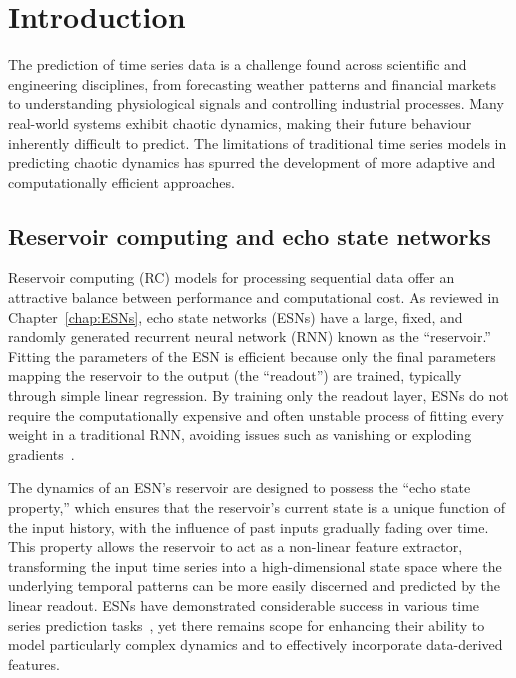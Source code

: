 
\renewcommand{\chapterlabel}{Chapter}
\chapter{Introduction}
\label{chap:introduction}

The prediction of time series data is a challenge found across scientific and engineering disciplines, from forecasting weather patterns and financial markets to understanding physiological signals and controlling industrial processes. Many real-world systems exhibit chaotic dynamics, making their future behaviour inherently difficult to predict. The limitations of traditional time series models in predicting chaotic dynamics has spurred the development of more adaptive and computationally efficient approaches.

\section{Reservoir computing and echo state networks}
\label{sec:rc_and_esn}

Reservoir computing (RC) models for processing sequential data offer an attractive balance between performance and computational cost. As reviewed in Chapter~\ref{chap:ESNs}, echo state networks (ESNs) have a large, fixed, and randomly generated recurrent neural network (RNN) known as the ``reservoir.'' Fitting the parameters of the ESN is efficient because only the final parameters mapping the reservoir to the output (the ``readout'') are trained, typically through simple linear regression.
By training only the readout layer, ESNs do not require the computationally expensive and often unstable process of fitting every weight in a traditional RNN, avoiding issues such as vanishing or exploding gradients~\cite{jaeger_2001}.

The dynamics of an ESN's reservoir are designed to possess the ``echo state property,'' which ensures that the reservoir's current state is a unique function of the input history, with the influence of past inputs gradually fading over time. This property allows the reservoir to act as a non-linear feature extractor, transforming the input time series into a high-dimensional state space where the underlying temporal patterns can be more easily discerned and predicted by the linear readout. ESNs have demonstrated considerable success in various time series prediction tasks~\cite{lukosevicius_and_jaeger_2009}, yet there remains scope for enhancing their ability to model particularly complex dynamics and to effectively incorporate data-derived features.

